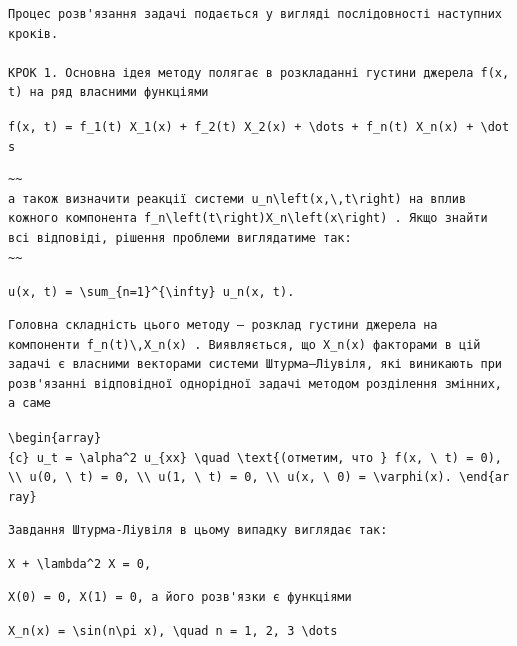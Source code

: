 \documentclass[
  ukrainian,
]{article}
\begin{document}
\begin{verbatim}
Процес розв'язання задачі подається у вигляді послідовності наступних кроків.

КРОК 1. Основна ідея методу полягає в розкладанні густини джерела f(x, t) на ряд власними функціями
\end{verbatim}

\texttt{f(x,\ t)\ =\ f\_1(t)\ X\_1(x)\ +\ f\_2(t)\ X\_2(x)\ +\ \textbackslash{}dots\ +\ f\_n(t)\ X\_n(x)\ +\ \textbackslash{}dots}

\begin{verbatim}
~~
а також визначити реакції системи u_n\left(x,\,t\right) на вплив кожного компонента f_n\left(t\right)X_n\left(x\right) . Якщо знайти всі відповіді, рішення проблеми виглядатиме так:
~~
\end{verbatim}

\texttt{u(x,\ t)\ =\ \textbackslash{}sum\_\{n=1\}\^{}\{\textbackslash{}infty\}\ u\_n(x,\ t).}

\begin{verbatim}
Головна складність цього методу — розклад густини джерела на компоненти f_n(t)\,X_n(x) . Виявляється, що X_n(x) факторами в цій задачі є власними векторами системи Штурма–Ліувіля, які виникають при розв'язанні відповідної однорідної задачі методом розділення змінних, а саме
\end{verbatim}

\texttt{\textbackslash{}begin\{array\}\{c\}\ u\_t\ =\ \textbackslash{}alpha\^{}2\ u\_\{xx\}\ \textbackslash{}quad\ \textbackslash{}text\{(отметим,\ что\ \}\ f(x,\ \textbackslash{}\ t)\ =\ 0),\ \textbackslash{}\textbackslash{}\ u(0,\ \textbackslash{}\ t)\ =\ 0,\ \textbackslash{}\textbackslash{}\ u(1,\ \textbackslash{}\ t)\ =\ 0,\ \textbackslash{}\textbackslash{}\ u(x,\ \textbackslash{}\ 0)\ =\ \textbackslash{}varphi(x).\ \textbackslash{}end\{array\}}

\begin{verbatim}
Завдання Штурма-Ліувіля в цьому випадку виглядає так:
\end{verbatim}

\texttt{X\textquotesingle{}\textquotesingle{}\ +\ \textbackslash{}lambda\^{}2\ X\ =\ 0,}

\begin{verbatim}
X(0) = 0, X(1) = 0, а його розв'язки є функціями
\end{verbatim}

\texttt{X\_n(x)\ =\ \textbackslash{}sin(n\textbackslash{}pi\ x),\ \textbackslash{}quad\ n\ =\ 1,\ 2,\ 3\ \textbackslash{}dots}
\end{document}
